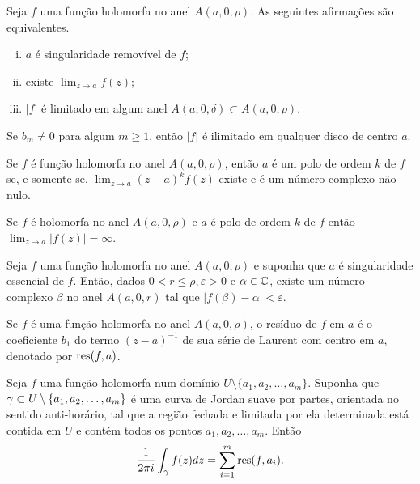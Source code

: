 \begin{proposicao}
Seja $f$ uma função holomorfa no anel $A(a, 0, \rho)$. As seguintes afirmações são equivalentes.
\begin{enumerate}[(i)]
    \item $a$ é singularidade removível de $f$;
    \item existe $\displaystyle{\lim_{z\to a} f(z)}$;
    \item $|f|$ é limitado em algum anel $A(a, 0, \delta) \subset A(a, 0, \rho)$.
\end{enumerate}
\end{proposicao}


\begin{corolario}
Se $b_m\neq 0$ para algum $m\geq 1$, então $|f|$ é ilimitado em qualquer disco de centro $a$.
\end{corolario}


\begin{proposicao}
Se $f$ é função holomorfa no anel $A(a, 0, \rho)$, então $a$ é um polo de ordem $k$ de $f$
se, e somente se, $\displaystyle{ \lim_{z\to a} (z-a)^k f(z) }$ existe e é um número complexo não nulo.
\end{proposicao}

\clearpage
\begin{corolario}
Se $f$ é holomorfa no anel $A(a, 0, \rho)$ e $a$ é polo de ordem $k$ de $f$ então
$\displaystyle{ \lim_{z\to a} |f(z)| = \infty }$.
\end{corolario}


\begin{teorema}
\label{teo-casorati-weierstrass}
Seja $f$ uma função holomorfa no anel $A(a,0,\rho)$ e suponha que $a$ é singularidade essencial de $f$.
Então, dados $0<r\leq\rho, \varepsilon > 0$ e $\alpha\in\mathbb{C}$, existe um número complexo $\beta$
no anel $A(a,0,r)$ tal que $|f(\beta) - \alpha| < \varepsilon$.
\end{teorema}


\begin{definicao}
Se $f$ é uma função holomorfa no anel $A(a, 0, \rho)$, o resíduo de $f$ em $a$ é o coeficiente $b_1$
do termo $(z-a)^{-1}$ de sua série de Laurent com centro em $a$, denotado por $\operatorname{res}(f, a)$.
\end{definicao}


\begin{teorema}
\label{teo-residuos}
Seja $f$ uma função holomorfa num domínio $U\setminus\{ a_1, a_2, \dots, a_m \}$. Suponha que 
$\gamma \subset U\setminus\{ a_1, a_2, \dots, a_m \}$ é uma curva de Jordan suave por partes,
orientada no sentido anti-horário, tal que a região fechada e limitada por ela determinada está
contida em $U$ e contém todos os pontos $ a_1, a_2, \dots, a_m$. Então
\begin{equation*}
    \frac{1}{2\pi i}\int_{\gamma} f(z) dz = \sum_{i=1}^m \operatorname{res}(f, a_i).
\end{equation*}
\end{teorema}



